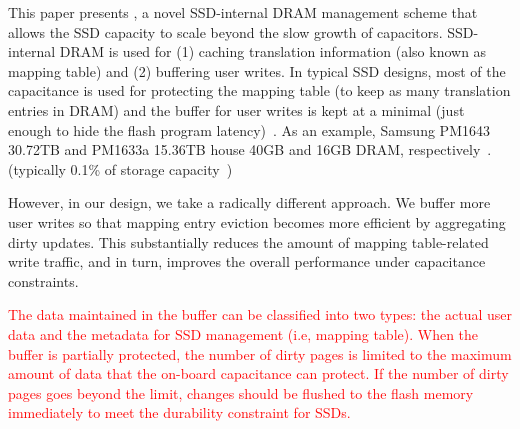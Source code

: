 This paper presents \ours{}, a novel SSD-internal DRAM management scheme 
that allows the SSD capacity to scale beyond the slow growth of capacitors. 
SSD-internal DRAM is used for 
(1) caching translation information (also known as mapping table) and (2) buffering user writes. 
In typical SSD designs, most of the capacitance is used for protecting the mapping table (to keep as many translation entries in DRAM) 
and the buffer for user writes is kept at a minimal (just enough to hide the flash program latency)~\cite{KangLMKO14sigmod}. 
As an example, Samsung PM1643 30.72TB and PM1633a 15.36TB house 40GB and 16GB DRAM, respectively~\cite{anandtech18samsung}. 
(typically 0.1\% of storage capacity~\cite{samsung_ratio, ni2017hash})

However, in our design, we take a radically different approach. 
We buffer more user writes so that mapping entry eviction becomes more efficient by aggregating dirty updates. 
This substantially reduces the amount of mapping table-related write traffic, and in turn, improves the overall performance under capacitance constraints. 


\textcolor{red}{
The data maintained in the buffer can be classified into two types: the actual user data and 
the metadata for SSD management (i.e, mapping table). 
When the buffer is partially protected, the number of dirty pages is limited to 
the maximum amount of data that the on-board capacitance can protect. 
If the number of dirty pages goes beyond the limit, changes should be flushed to the flash memory immediately
to meet the durability constraint for SSDs. 
}
